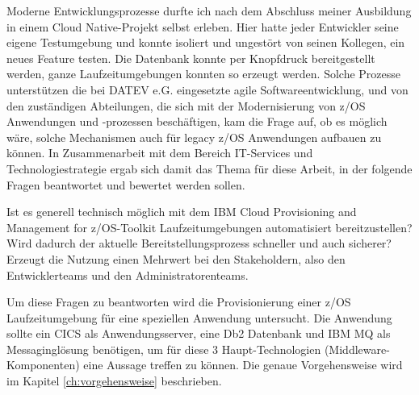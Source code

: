 Moderne Entwicklungsprozesse durfte ich nach dem Abschluss meiner Ausbildung in einem \glqq Cloud Native\grqq-Projekt selbst erleben.
Hier hatte jeder Entwickler seine eigene Testumgebung und konnte isoliert und ungestört von seinen Kollegen, ein neues Feature testen.
Die Datenbank konnte per Knopfdruck bereitgestellt werden, ganze Laufzeitumgebungen konnten so erzeugt werden.
Solche Prozesse unterstützen die bei DATEV e.G. eingesetzte agile Softwareentwicklung, und von den zuständigen Abteilungen, die sich mit der Modernisierung von z/OS Anwendungen und -prozessen beschäftigen,  kam die Frage auf, ob es möglich wäre, solche Mechanismen auch für legacy z/OS Anwendungen aufbauen zu können.
In Zusammenarbeit mit dem Bereich IT-Services und Technologiestrategie ergab sich damit das Thema für diese Arbeit, in der folgende Fragen beantwortet und bewertet werden sollen.

Ist es generell technisch möglich mit dem \glqq IBM Cloud Provisioning and Management for z/OS\grqq-Toolkit Laufzeitumgebungen automatisiert bereitzustellen?
Wird dadurch der aktuelle Bereitstellungsprozess schneller und auch sicherer?
Erzeugt die Nutzung einen Mehrwert bei den Stakeholdern, also den Entwicklerteams und den Administratorenteams.

Um diese Fragen zu beantworten wird die Provisionierung einer z/OS Laufzeitumgebung für eine speziellen Anwendung untersucht.
Die Anwendung sollte ein CICS als Anwendungsserver, eine Db2 Datenbank und IBM MQ als Messaginglösung benötigen, um für diese 3 Haupt-Technologien (Middleware-Komponenten) eine Aussage treffen zu können.
Die genaue Vorgehensweise wird im Kapitel \ref{ch:vorgehensweise} beschrieben.